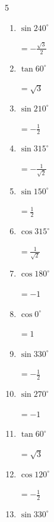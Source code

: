 \begin{multicols}{5}
\begin{enumerate}
  \item $\displaystyle \sin{240^\circ}$

        $\displaystyle =-\frac{\sqrt{3}}{2}$

  \item $\displaystyle \tan{60^\circ}$

        $\displaystyle =\sqrt{3}$

  \item $\displaystyle \sin{210^\circ}$

        $\displaystyle =-\frac{1}{2}$

  \item $\displaystyle \sin{315^\circ}$

        $\displaystyle =-\frac{1}{\sqrt{2}}$

  \item $\displaystyle \sin{150^\circ}$

        $\displaystyle =\frac{1}{2}$

  \item $\displaystyle \cos{315^\circ}$

        $\displaystyle =\frac{1}{\sqrt{2}}$

  \item $\displaystyle \cos{180^\circ}$

        $\displaystyle =-1$

  \item $\displaystyle \cos{0^\circ}$

        $\displaystyle =1$

  \item $\displaystyle \sin{330^\circ}$

        $\displaystyle =-\frac{1}{2}$

  \item $\displaystyle \sin{270^\circ}$

        $\displaystyle =-1$

\columnbreak %

\resetques

  \item $\displaystyle \tan{60^\circ}$

        $\displaystyle =\sqrt{3}$

  \item $\displaystyle \cos{120^\circ}$

        $\displaystyle =-\frac{1}{2}$

  \item $\displaystyle \sin{330^\circ}$


\end{enumerate}
\end{multicols}
